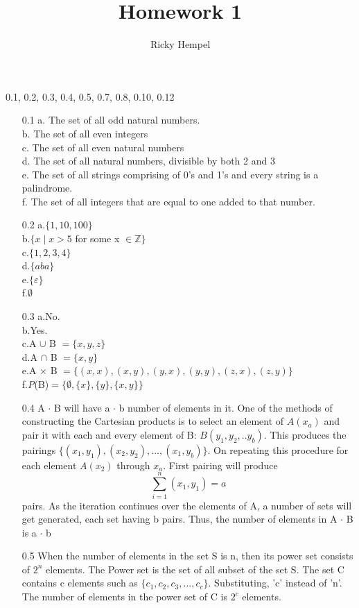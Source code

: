 \documentclass[10pt] {article}
\title{Homework 1 }
\author{Ricky Hempel}
\begin{document}
\maketitle
\begin{center}
0.1, 0.2, 0.3, 0.4, 0.5, 0.7, 0.8, 0.10, 0.12
\end{center}
\begin{enumerate}
\item[0.1]a. The set of all odd natural numbers.\\
b. The set of all even integers\\
c. The set of all even natural numbers\\
d. The set of all natural numbers, divisible by both 2 and 3 \\
e. The set of all strings comprising of 0's and 1's and every string is a palindrome. \\
f. The set of all integers that are equal to one added to that number.
\item[0.2]
a.$\{ 1,10,100 \}$\\
b.$\{x \mid x > 5$ for some x $\in \mathbb{Z} \}$\\
c.$\{1,2,3,4 \}$\\
d.$\{aba \}$\\
e.$\{ \varepsilon \}$\\
f.$\emptyset$
\item[0.3]
a.No.\\
b.Yes.\\
c.A $\cup$ B $= \{x,y,z\}$\\
d.A $\cap$ B $=\{ x,y\}$\\
e.A $\times$ B $= \{ (x,x),(x,y),(y,x),(y,y),(z,x),(z,y) \}$\\
f.\textit{P}(B)$= \{ \emptyset,\{x\},\{y\},\{x,y\} \}$
\item[0.4] A $\cdot$ B will have a $\cdot$ b number of elements in it. One of the methods of constructing the Cartesian products is to select an element of $A(x_a)$ and pair it with each and every element of B: $B(y_1,y_2,..y_b)$. This produces the pairings $\{(x_1,y_1),(x_2,y_2),...,(x_1,y_b) \}$. On repeating this procedure for each element $A(x_2)$ through $x_a$. First pairing will produce $$\sum_{i=1}^{n} (x_1,y_1) = a$$ pairs. As the iteration continues over the elements of A, a number of sets will get generated, each set having b pairs. Thus, the number of elements in A $\cdot$ B is a $\cdot$ b
\item[0.5] When the number of elements in the set S is n, then its power set consists of $2^{n}$ elements. The Power set is the set of all subset of the set S. The set C contains c elements such as $\{c_1 ,c_2, c_3,...,c_c\}$. Substituting, 'c' instead of 'n'. The number of elements in the power set of C is $2^c$ elements. 

\end{enumerate}
\end{document}
